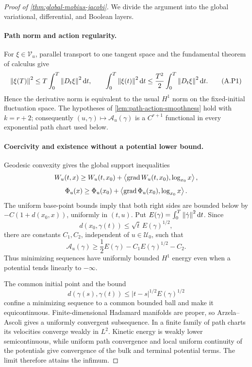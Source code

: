 \begin{proof}[Proof of \cref{thm:global-mobius-jacobi}]
We divide the argument into the global variational, differential, and Boolean
layers.

\paragraph{Path norm and action regularity.}
For \(\xi\in\mathcal V_u\), parallel transport to one tangent space and the
fundamental theorem of calculus give
\begin{equation}
  \left\lVert \xi(T)\right\rVert^2
  \le T\int_0^T\left\lVert D_t\xi\right\rVert^2\mathrm d t,
  \qquad
  \int_0^T\left\lVert \xi(t)\right\rVert^2\mathrm d t
  \le\frac{T^2}{2}\int_0^T\left\lVert D_t\xi\right\rVert^2\mathrm d t.
  \tag{A.P1}
\end{equation}
Hence the derivative norm is equivalent to the usual \(H^1\) norm on the
fixed-initial fluctuation space.  The hypotheses of
\cref{lem:path-action-smoothness} hold with \(k=r+2\); consequently
\((u,\gamma)\mapsto\mathcal A_u(\gamma)\) is a \(C^{r+1}\) functional in
every exponential path chart used below.

\paragraph{Coercivity and existence without a potential lower bound.}
Geodesic convexity gives the global support inequalities
\[
  W_u(t,x)
  \ge W_u(t,x_0)
  +\left\langle \operatorname{grad}W_u(t,x_0),\log_{x_0}x\right\rangle,
\]
\[
  \Phi_u(x)
  \ge \Phi_u(x_0)
  +\left\langle \operatorname{grad}\Phi_u(x_0),\log_{x_0}x\right\rangle.
\]
The uniform base-point bounds imply that both right sides are bounded below
by \(-C(1+d(x_0,x))\), uniformly in \((t,u)\).  Put
\(E(\gamma)=\int_0^T\left\lVert \dot\gamma\right\rVert^2\mathrm d t\).  Since
\[
  d(x_0,\gamma(t))\le\sqrt t\,E(\gamma)^{1/2},
\]
there are constants \(C_1,C_2\), independent of \(u\in\mathcal U_0\), such
that
\begin{equation}
  \mathcal A_u(\gamma)
  \ge\frac12E(\gamma)-C_1E(\gamma)^{1/2}-C_2.
  \tag{A.P2}
\end{equation}
Thus minimizing sequences have uniformly bounded \(H^1\) energy even when a
potential tends linearly to \(-\infty\).

The common initial point and the bound
\[
  d(\gamma(s),\gamma(t))
  \le |t-s|^{1/2}E(\gamma)^{1/2}
\]
confine a minimizing sequence to a common bounded ball and make it
equicontinuous.  Finite-dimensional Hadamard manifolds are proper, so
Arzela--Ascoli gives a uniformly convergent subsequence.  In a finite family
of path charts its velocities converge weakly in \(L^2\).  Kinetic energy is
weakly lower semicontinuous, while uniform path convergence and local uniform
continuity of the potentials give convergence of the bulk and terminal
potential terms.  The limit therefore attains the infimum.


\end{proof}
